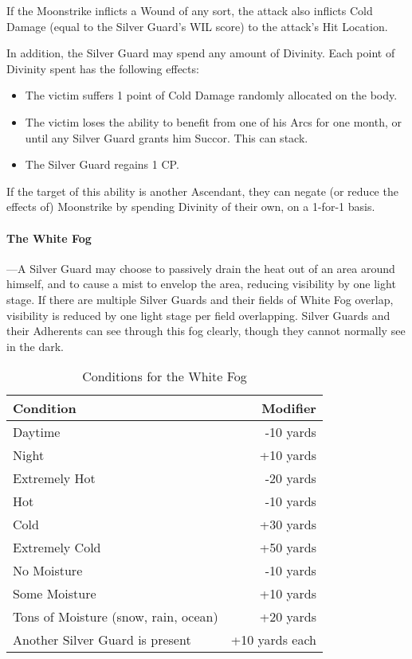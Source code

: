 \documentclass[oneside,11pt,english]{book}
\begin{document}
If the Moonstrike inflicts a Wound of any sort, the attack also inflicts Cold Damage (equal to the 
Silver Guard's WIL score) to the attack’s Hit Location. 


In addition, the Silver Guard may spend any amount of Divinity. Each point of Divinity spent has 
the following effects: 
\begin{itemize}
\item The victim suffers 1 point of Cold Damage randomly allocated on the body. 
\item The victim loses the ability to benefit from one of his Arcs for one month, or until any 
  Silver Guard grants him Succor. This can stack. 
\item The Silver Guard regains 1 CP. 
\end{itemize}
If the target of this ability is another Ascendant, they can negate (or reduce the effects of) Moonstrike by spending Divinity of their own, on a 1-for-1 basis. 

\newpage
\paragraph{The White Fog}
---\quad A Silver Guard may choose to passively drain the heat out of an area around himself, and to cause 
a mist to envelop the area, reducing visibility by one light stage. If there are multiple Silver 
Guards and their fields of White Fog overlap, visibility is reduced by one light stage per field 
overlapping. Silver Guards and their Adherents can see through this fog clearly, though they 
cannot normally see in the dark. 

\setlength{\intextsep}{0pt}
\begin{wraptable}{r}{9 cm}
  \vspace{-10pt}\caption{Conditions for the White Fog}
  \label{tab:Dessian White Fog}
  \begin{tabu} spread 0pt {Xr}
    Condition&Modifier\\\toprule
    Daytime&-10 yards\\
    Night&+10 yards\\
    Extremely Hot&-20 yards \\
    Hot&-10 yards \\
    Cold&+30 yards \\
    Extremely Cold&+50 yards \\
    No Moisture&-10 yards \\
    Some Moisture&+10 yards \\
    Tons of Moisture (snow, rain, ocean)&+20 yards \\
    Another Silver Guard is present&+10 yards each \\
  \end{tabu}
\end{wraptable}
\setlength{\intextsep}{\oldintextsep}
\end{document}
